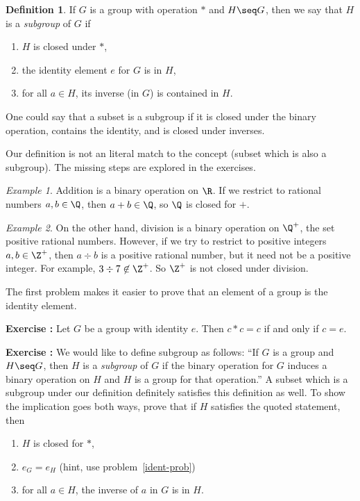 \documentclass[12pt]{amsart}
\newcounter{probs}
\newenvironment{prob}{%
  \refstepcounter{probs}
  \par\medskip\noindent\textbf{Exercise \theprobs:} }{\par\medskip}
\theoremstyle{plain}
\theoremstyle{definition}
\newtheorem{defn}[thm]{Definition}
\theoremstyle{remark}
\newtheorem*{exam}{Example}
\begin{document}
\begin{defn}
  If $G$ is a group with operation $*$ and $H\seq G$, then we say that
  $H$ is a \emph{subgroup} of $G$ if
  \begin{enumerate}
  \item $H$ is closed under $*$,
  \item the identity element $e$ for $G$ is in $H$,
  \item for all $a\in H$, its inverse (in $G$) is contained in $H$.
  \end{enumerate}
\end{defn}

One could say that a subset is a subgroup if it is closed under the
binary operation, contains the identity, and is closed under
inverses.

Our definition is not an literal match to the concept (subset which is
also a subgroup).  The missing steps are explored in the exercises.

\begin{exam}
  Addition is a binary operation on $\R$.  If we restrict to rational
  numbers $a,b\in\Q$, then $a+b\in\Q$, so $\Q$ is closed for $+$.
\end{exam}
\begin{exam}
  On the other hand, division is a binary operation on $\Q^+$, the set
  positive rational numbers.  However, if we try to restrict to
  positive integers $a,b\in\Z^+$, then $a\div b$ is a positive
  rational number, but it need not be a positive integer.  For
  example, $3\div 7\not\in\Z^+$.  So $\Z^+$ is not closed under
  division.
\end{exam}

The first problem makes it easier to prove that an element of a group
is the identity element.
\begin{prob} \label{ident-prob}
Let $G$ be a group with identity $e$.  Then $c*c=c$ if and only if $c=e$.
\end{prob}

\begin{prob}
  We would like to define subgroup as follows: ``If $G$ is a group and
  $H\seq G$, then $H$ is a \emph{subgroup} of $G$ if the binary
  operation for $G$ induces a binary operation on $H$ and $H$ is a
  group for that operation.''  A subset which is a subgroup under our
  definition definitely satisfies this definition as well.  To show
  the implication goes both ways, prove that if $H$ satisfies the
  quoted statement, then
  \begin{enumerate}
  \item $H$ is closed for $*$,
  \item $e_G=e_H$ (hint, use problem~\ref{ident-prob})
  \item for all $a\in H$, the inverse of $a$ in $G$ is in $H$.
  \end{enumerate}
\end{prob}
\end{document}
